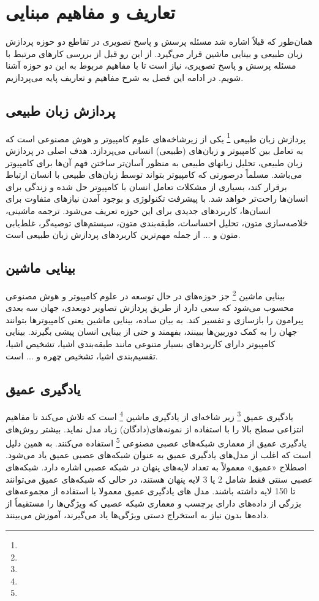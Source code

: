 \chapter{تعاریف و مفاهیم مبنایی}
\thispagestyle{empty}
	همان‌طور که قبلاً اشاره شد مسئله پرسش و پاسخ تصویری در تقاطع دو حوزه پردازش زبان طبیعی و بینایی ماشین قرار می‌گیرد. از این رو قبل از بررسی کارهای مرتبط با مسئله پرسش و پاسخ تصویری، نیاز است تا با مفاهیم مربوط به این دو حوزه آشنا شویم. در ادامه این فصل به شرح مفاهیم و تعاریف پایه می‌پردازیم.

\section{پردازش زبان طبیعی}
	پردازش زبان‌ طبیعی 
	\footnote{}
	یکی از زیرشاخه‌های علوم کامپیوتر و هوش مصنوعی است که به تعامل بین کامپیوتر و زبان‌های (طبیعی) انسانی می‌پردازد. هدف اصلی در پردازش زبان طبیعی، تحلیل زبانهای طبیعی به منظور آسان‌تر ساختن فهم آ‌ن‌ها برای کامپیوتر می‌باشد. مسلماً درصورتی که کامپیوتر بتواند توسط زبان‌های طبیعی با انسان ارتباط برقرار کند، بسیاری از مشکلات تعامل انسان با کامپیوتر حل شده و زندگی برای انسان‌ها راحت‌تر خواهد شد. با پیشرفت تکنولوژی و بوجود آمدن نیازهای متفاوت برای انسان‌ها، کاربردهای جدیدی برای این حوزه تعریف می‌شود. ترجمه ماشینی، خلاصه‌سازی متون، تحلیل احساسات، طبقه‌بندی متون، سیستم‌های توصیه‌گر، غلط‌یابی متون و ... از جمله مهم‌ترین کاربردهای پردازش زبان طبیعی است.
	
\section{بینایی ماشین}
 بینایی ماشین
	\footnote{}
  جز حوزه‌های در حال توسعه در علوم کامپیوتر و هوش مصنوعی محسوب می‌شود که سعی دارد از طریق پردازش تصاویر دوبعدی، جهان سه بعدی پیرامون را بازسازی و تفسیر کند. به بیان ساده، بینایی ماشین یعنی کامپیوترها بتوانند جهان را به کمک دوربین‌ها ببینند، بفهمند و حتی از بینایی انسان پیشی بگیرند. بینایی کامپیوتر دارای کاربردهای بسیار متنوعی مانند طبقه‌بندی اشیا، تشخیص اشیا، تقسیم‌بندی اشیا، تشخیص چهره و ... است.

\section{یادگیری عمیق}
	یادگیری عمیق
	\footnote{}
	زیر شاخه‌ای از یادگیری ماشین
	 \footnote{}
	  است که تلاش می‌کند تا مفاهیم انتزاعی سطح بالا را با استفاده از نمونه‌های(دادگان) زیاد مدل نماید. بیشتر روش‌های یادگیری عمیق از معماری شبکه‌های عصبی مصنوعی
	  \footnote{}
	  استفاده می‌کنند‌. به همین دلیل است که اغلب از مدل‌های یادگیری عمیق به عنوان شبکه‌های عصبی عمیق یاد می‌شود. اصطلاح «عمیق» معمولاً به تعداد لایه‌های پنهان در شبکه عصبی اشاره دارد. شبکه‌های عصبی سنتی فقط شامل 2 یا 3 لایه پنهان هستند، در حالی که شبکه‌های عمیق می‌توانند تا 150 لایه داشته باشند. مدل های یادگیری عمیق معمولا با استفاده از مجموعه‌های بزرگی از داده‌های دارای برچسب و معماری شبکه عصبی که ویژگی‌ها را مستقیماً از داده‌ها بدون نیاز به استخراج دستی ویژگی‌ها یاد می‌گیرند، آموزش می‌بینند.
	  
